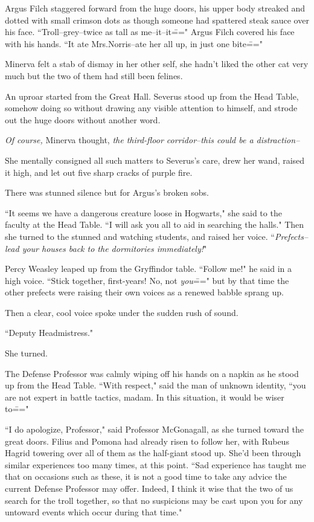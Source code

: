 Argus Filch staggered forward from the huge doors, his upper body streaked and dotted with small crimson dots as though someone had spattered steak sauce over his face. ``Troll\---grey\---twice as tall as me\---it\---it\===" Argus Filch covered his face with his hands. ``It ate Mrs.\?Norris\---ate her all up, in just one bite\==="

Minerva felt a stab of dismay in her other self, she hadn't liked the other cat very much but the two of them had still been felines.

An uproar started from the Great Hall. Severus stood up from the Head Table, somehow doing so without drawing any visible attention to himself, and strode out the huge doors without another word.

\emph{Of course,} Minerva thought, \emph{the third-floor corridor\---this could be a distraction\---}

She mentally consigned all such matters to Severus's care, drew her wand, raised it high, and let out five sharp cracks of purple fire.

There was stunned silence but for Argus's broken sobs.

``It seems we have a dangerous creature loose in Hogwarts," she said to the faculty at the Head Table. ``I will ask you all to aid in searching the halls." Then she turned to the stunned and watching students, and raised her voice. ``\emph{Prefects\---lead your houses back to the dormitories immediately!}"

Percy Weasley leaped up from the Gryffindor table. ``Follow me!" he said in a high voice. ``Stick together, first-years! No, not \emph{you}\===" but by that time the other prefects were raising their own voices as a renewed babble sprang up.

Then a clear, cool voice spoke under the sudden rush of sound.

``Deputy Headmistress."

She turned.

The Defense Professor was calmly wiping off his hands on a napkin as he stood up from the Head Table. ``With respect," said the man of unknown identity, ``you are not expert in battle tactics, madam. In this situation, it would be wiser to\==="

``I do apologize, Professor," said Professor McGonagall, as she turned toward the great doors. Filius and Pomona had already risen to follow her, with Rubeus Hagrid towering over all of them as the half-giant stood up. She'd been through similar experiences too many times, at this point. ``Sad experience has taught me that on occasions such as these, it is not a good time to take any advice the current Defense Professor may offer. Indeed, I think it wise that the two of us search for the troll together, so that no suspicions may be cast upon you for any untoward events which occur during that time."

